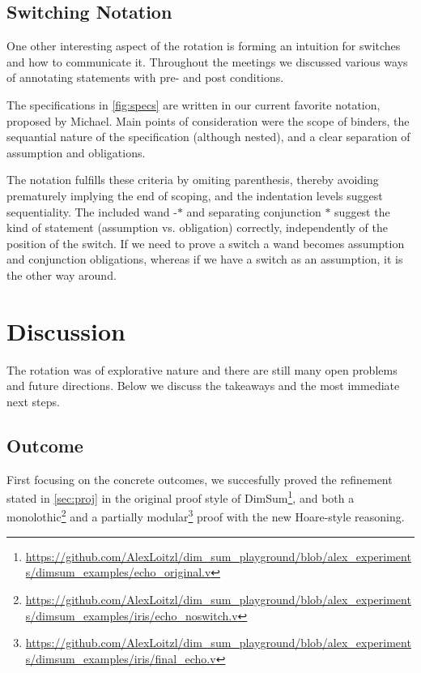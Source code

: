 \documentclass[runningheads, orivec]{llncs}
\begin{document}
\subsection{Switching Notation}

One other interesting aspect of the rotation is forming an intuition for switches and how to communicate it. Throughout the meetings we discussed various ways of annotating statements with pre- and post conditions.

The specifications in \cref{fig:specs} are written in our current favorite notation, proposed by Michael.
Main points of consideration were the scope of binders, the sequantial nature of the specification (although nested), and a clear separation of assumption and obligations.

The notation fulfills these criteria by omiting parenthesis, thereby avoiding prematurely implying the end of scoping, and the indentation levels suggest sequentiality. The included wand -$\ast$ and separating conjunction $\ast$ suggest the kind of statement (assumption vs. obligation) correctly, independently of the position of the switch.
If we need to prove a switch a wand becomes assumption and conjunction obligations, whereas if we have a switch as an assumption, it is the other way around.

\section{Discussion}

The rotation was of explorative nature and there are still many open problems and future directions. Below we discuss the takeaways and the most immediate next steps.

\subsection{Outcome}

First focusing on the concrete outcomes, we succesfully proved the refinement stated in \cref{sec:proj} in the original proof style of DimSum\footnote{\url{https://github.com/AlexLoitzl/dim_sum_playground/blob/alex_experiments/dimsum_examples/echo_original.v}}, and both a monolothic\footnote{\url{https://github.com/AlexLoitzl/dim_sum_playground/blob/alex_experiments/dimsum_examples/iris/echo_noswitch.v}} and a partially modular\footnote{\url{https://github.com/AlexLoitzl/dim_sum_playground/blob/alex_experiments/dimsum_examples/iris/final_echo.v}} proof with the new Hoare-style reasoning.
\end{document}
